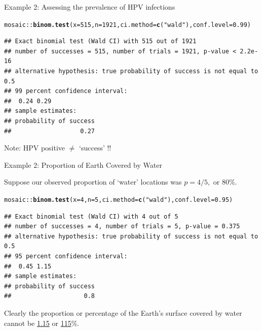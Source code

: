 \documentclass[10pt]{beamer}\usepackage[]{graphicx}\usepackage[]{color}
\makeatletter
\newcommand{\hlnum}[1]{\textcolor[rgb]{0.686,0.059,0.569}{#1}}%
\newcommand{\hlstr}[1]{\textcolor[rgb]{0.192,0.494,0.8}{#1}}%
\newcommand{\hlopt}[1]{\textcolor[rgb]{0,0,0}{#1}}%
\newcommand{\hlstd}[1]{\textcolor[rgb]{0.345,0.345,0.345}{#1}}%
\newcommand{\hlkwc}[1]{\textcolor[rgb]{0.333,0.667,0.333}{#1}}%
\newcommand{\hlkwd}[1]{\textcolor[rgb]{0.737,0.353,0.396}{\textbf{#1}}}%
\newenvironment{kframe}{%
 \def\at@end@of@kframe{}%
 \ifinner\ifhmode%
  \def\at@end@of@kframe{\end{minipage}}%
  \begin{minipage}{\columnwidth}%
 \fi\fi%
 \def\FrameCommand##1{\hskip\@totalleftmargin \hskip-\fboxsep
 \colorbox{shadecolor}{##1}\hskip-\fboxsep
     \hskip-\linewidth \hskip-\@totalleftmargin \hskip\columnwidth}%
 \MakeFramed {\advance\hsize-\width
   \@totalleftmargin\z@ \linewidth\hsize
   \@setminipage}}%
 {\par\unskip\endMakeFramed%
 \at@end@of@kframe}
\newenvironment{knitrout}{}{} %
\makeatother
\begin{document}
\begin{frame}[fragile]{Example 2: Assessing the prevalence of HPV infections}
	
\begin{knitrout}\tiny
{}\color{fgcolor}\begin{kframe}
\begin{alltt}
\hlstd{mosaic}\hlopt{::}\hlkwd{binom.test}\hlstd{(}\hlkwc{x} \hlstd{=} \hlnum{515}\hlstd{,} \hlkwc{n} \hlstd{=} \hlnum{1921}\hlstd{,} \hlkwc{ci.method}\hlstd{=}\hlkwd{c}\hlstd{(}\hlstr{"wald"}\hlstd{),} \hlkwc{conf.level}\hlstd{=}\hlnum{0.99}\hlstd{)}
\end{alltt}
\begin{verbatim}
## Exact binomial test (Wald CI) with 515 out of 1921 
## number of successes = 515, number of trials = 1921, p-value < 2.2e-16
## alternative hypothesis: true probability of success is not equal to 0.5 
## 99 percent confidence interval:
##  0.24 0.29 
## sample estimates:
## probability of success 
##                   0.27
\end{verbatim}
\end{kframe}
\end{knitrout}
	Note: HPV positive $\ne$ `success' !!
\end{frame}



\begin{frame}[fragile]{Example 2: Proportion of Earth Covered by Water}
	
	Suppose our observed proportion of `water' locations was $p = 4/5,$ or 80\%.
	
\begin{knitrout}\tiny
{}\color{fgcolor}\begin{kframe}
\begin{alltt}
\hlstd{mosaic}\hlopt{::}\hlkwd{binom.test}\hlstd{(}\hlkwc{x} \hlstd{=} \hlnum{4}\hlstd{,} \hlkwc{n} \hlstd{=} \hlnum{5}\hlstd{,} \hlkwc{ci.method}\hlstd{=}\hlkwd{c}\hlstd{(}\hlstr{"wald"}\hlstd{),} \hlkwc{conf.level}\hlstd{=}\hlnum{0.95}\hlstd{)}
\end{alltt}
\begin{verbatim}
## Exact binomial test (Wald CI) with 4 out of 5 
## number of successes = 4, number of trials = 5, p-value = 0.375
## alternative hypothesis: true probability of success is not equal to 0.5 
## 95 percent confidence interval:
##  0.45 1.15 
## sample estimates:
## probability of success 
##                    0.8
\end{verbatim}
\end{kframe}
\end{knitrout}
	
	\pause 
	
	Clearly  the proportion or percentage of the Earth's surface covered by water cannot
	be \underline{1.15} or \underline{115}\%.  
	
\end{frame}
\end{document}
